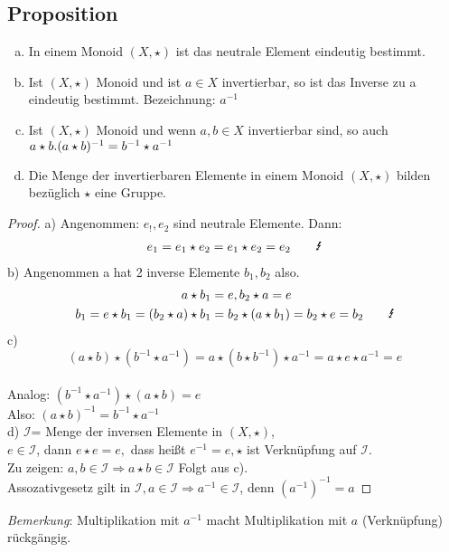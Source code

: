 \subsection{Proposition}\label{sec:1.5}
\begin{enumerate}[a)]
\item In einem Monoid $(X,\star)$ ist das neutrale Element eindeutig bestimmt.
\item Ist $(X,\star)$ Monoid und ist $a \in X$ invertierbar, so ist das Inverse zu a eindeutig bestimmt. Bezeichnung: $a^{-1}$
\item Ist $(X, \star)$ Monoid und wenn $a,b \in X$ invertierbar sind, so auch $a \star b.\\
(a \star b)^{-1} = b^{-1} \star a^{-1}$
\item Die Menge der invertierbaren Elemente in einem Monoid $(X, \star)$ bilden bezüglich $\star$ eine Gruppe.
\end{enumerate}
\begin{proof}
a) Angenommen: $e_!,e_2$ sind neutrale Elemente. Dann:\\
\begin{align}
e_1 = e_1 \star e_2 = e_1 \star e_2 = e_2 \qquad{\text{\Lightning}}\notag
\end{align}
b) Angenommen a hat 2 inverse Elemente $b_1, b_2$ also.\\
\begin{align}
a \star b_1 &= e, b_2 \star a = e \notag\\
b_1 = e \star b_1 = (b_2 \star a) \star b_1 &= b_2 \star (a \star b_1) = b_2 \star e = b_2 \qquad \text{\Lightning} \notag
\end{align}
c) $$(a \star b)\star (b^{-1} \star a^{-1}) = a \star (b \star b^{-1}) \star a^{-1} = a \star e \star a^{-1} = e$$\\
Analog: $(b^{-1} \star a^{-1})\star (a \star b) =e $\\
Also: $(a \star b)^{-1} = b^{-1} \star a^{-1}$\\
d) $\mathcal{I}$= Menge der inversen Elemente in $(X, \star)$,\\ $e \in \mathcal{I}$, dann $e \star e = e,$ dass hei\ss t $e^{-1} = e, \star$ ist Verknüpfung auf $\mathcal{I}$.\\
Zu zeigen: $a,b \in \mathcal{I} \Rightarrow a \star b \in \mathcal{I}$ Folgt aus c).\\
Assozativgesetz gilt in $\mathcal{I}, a \in \mathcal{I} \Rightarrow a^{-1} \in \mathcal{I}$, denn $(a^{-1})^{-1} = a$
\end{proof}
\emph{Bemerkung}: Multiplikation mit $a^{-1}$ macht Multiplikation mit $a$ (Verknüpfung) rückgängig.
